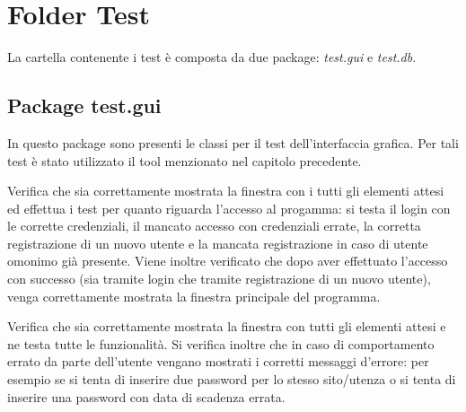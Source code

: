 \section{Folder Test}
La cartella contenente i test è composta da due package: \emph{test.gui} e \emph{test.db}.
\subsection{Package test.gui}
In questo package sono presenti le classi per il test dell'interfaccia grafica. Per tali test è stato utilizzato il tool  menzionato nel capitolo precedente.
\begin{myitemize}{}
	\item[\class{LoginGUITestIT}] Verifica che sia correttamente mostrata la finestra con i tutti gli elementi attesi ed effettua i test per quanto riguarda l'accesso al progamma: si testa il login con le corrette credenziali, il mancato accesso con credenziali errate, la corretta registrazione di un nuovo utente e la mancata registrazione in caso di utente omonimo già presente. Viene inoltre verificato che dopo aver effettuato l'accesso con successo (sia tramite login che tramite registrazione di un nuovo utente), venga correttamente mostrata la finestra principale del programma.
	
	\item[\class{PasswordManagerGUITest}] Verifica che sia correttamente mostrata la finestra con tutti gli elementi attesi e ne testa tutte le funzionalità. Si verifica inoltre che in caso di comportamento errato da parte dell'utente vengano mostrati i corretti messaggi d'errore: per esempio se si tenta di inserire due password per lo stesso sito/utenza o si tenta di inserire una password con data di scadenza errata.
\end{myitemize}
\newpage
